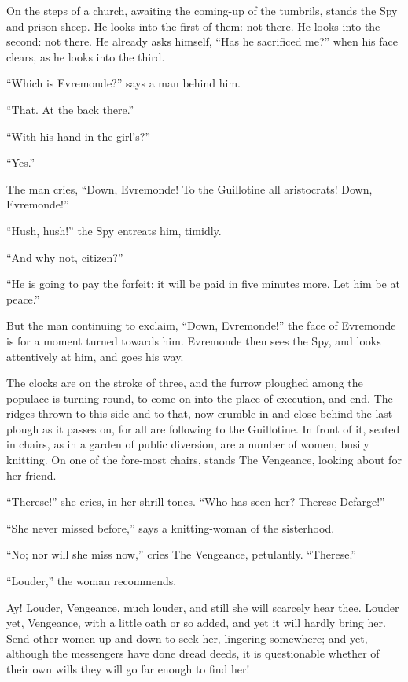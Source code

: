 On the steps of a church, awaiting the coming-up of the tumbrils,
stands the Spy and prison-sheep.  He looks into the first of them:
not there.  He looks into the second:  not there.  He already asks
himself, ``Has he sacrificed me?'' when his face clears, as he looks
into the third.

``Which is Evremonde?'' says a man behind him.

``That.  At the back there.''

``With his hand in the girl's?''

``Yes.''

The man cries, ``Down, Evremonde!  To the Guillotine all aristocrats!
Down, Evremonde!''

``Hush, hush!'' the Spy entreats him, timidly.

``And why not, citizen?''

``He is going to pay the forfeit:  it will be paid in five minutes more.
Let him be at peace.''

But the man continuing to exclaim, ``Down, Evremonde!'' the face of
Evremonde is for a moment turned towards him.  Evremonde then sees
the Spy, and looks attentively at him, and goes his way.

The clocks are on the stroke of three, and the furrow ploughed among
the populace is turning round, to come on into the place of execution,
and end.  The ridges thrown to this side and to that, now crumble in
and close behind the last plough as it passes on, for all are following
to the Guillotine.  In front of it, seated in chairs, as in a garden
of public diversion, are a number of women, busily knitting.  On one
of the fore-most chairs, stands The Vengeance, looking about for her friend.

``Therese!'' she cries, in her shrill tones.  ``Who has seen her?
Therese Defarge!''

``She never missed before,'' says a knitting-woman of the sisterhood.

``No; nor will she miss now,'' cries The Vengeance, petulantly.  ``Therese.''

``Louder,'' the woman recommends.

Ay!  Louder, Vengeance, much louder, and still she will scarcely hear
thee.  Louder yet, Vengeance, with a little oath or so added, and yet
it will hardly bring her.  Send other women up and down to seek her,
lingering somewhere; and yet, although the messengers have done dread
deeds, it is questionable whether of their own wills they will go far
enough to find her!

